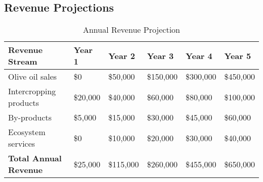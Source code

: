 \subsection{Revenue Projections}

\begin{table}[h]
\centering
\begin{tabular}{|p{3cm}|p{2cm}|p{2cm}|p{2cm}|p{2cm}|p{2cm}|}
\hline
\textbf{Revenue Stream} & \textbf{Year 1} & \textbf{Year 2} & \textbf{Year 3} & \textbf{Year 4} & \textbf{Year 5} \\
\hline
Olive oil sales & \$0 & \$50,000 & \$150,000 & \$300,000 & \$450,000 \\
Intercropping products & \$20,000 & \$40,000 & \$60,000 & \$80,000 & \$100,000 \\
By-products & \$5,000 & \$15,000 & \$30,000 & \$45,000 & \$60,000 \\
Ecosystem services & \$0 & \$10,000 & \$20,000 & \$30,000 & \$40,000 \\
\hline
\textbf{Total Annual Revenue} & \$25,000 & \$115,000 & \$260,000 & \$455,000 & \$650,000 \\
\hline
\end{tabular}
\caption{Annual Revenue Projection}
\end{table}

